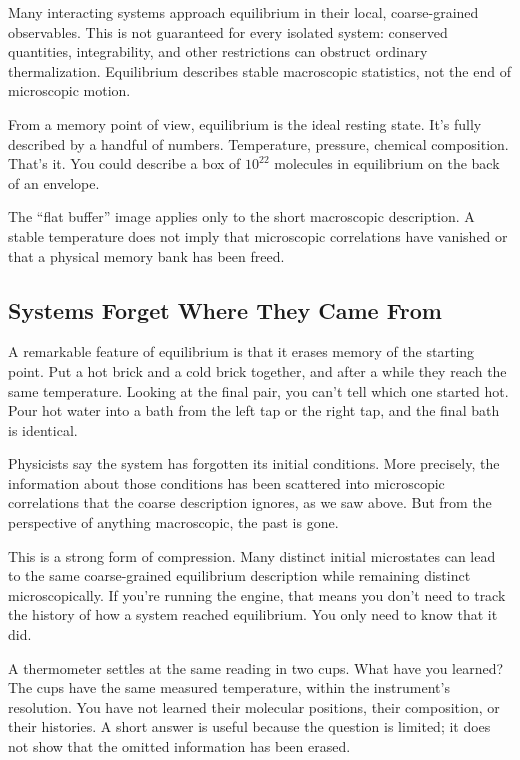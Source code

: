 Many interacting systems approach equilibrium in their local, coarse-grained observables. This is not guaranteed for every isolated system: conserved quantities, integrability, and other restrictions can obstruct ordinary thermalization. Equilibrium describes stable macroscopic statistics, not the end of microscopic motion.

From a memory point of view, equilibrium is the ideal resting state. It's fully described by a handful of numbers. Temperature, pressure, chemical composition. That's it. You could describe a box of \(10^{22}\) molecules in equilibrium on the back of an envelope.

The ``flat buffer'' image applies only to the short macroscopic description. A stable temperature does not imply that microscopic correlations have vanished or that a physical memory bank has been freed.

\subsection{Systems Forget Where They Came From}

A remarkable feature of equilibrium is that it erases memory of the starting point. Put a hot brick and a cold brick together, and after a while they reach the same temperature. Looking at the final pair, you can't tell which one started hot. Pour hot water into a bath from the left tap or the right tap, and the final bath is identical.

Physicists say the system has forgotten its initial conditions. More precisely, the information about those conditions has been scattered into microscopic correlations that the coarse description ignores, as we saw above. But from the perspective of anything macroscopic, the past is gone.

This is a strong form of compression. Many distinct initial microstates can lead to the same coarse-grained equilibrium description while remaining distinct microscopically. If you're running the engine, that means you don't need to track the history of how a system reached equilibrium. You only need to know that it did.

\begin{quickpracticebox}
A thermometer settles at the same reading in two cups. What have you learned? The cups have the same measured temperature, within the instrument's resolution. You have not learned their molecular positions, their composition, or their histories. A short answer is useful because the question is limited; it does not show that the omitted information has been erased.
\end{quickpracticebox}

